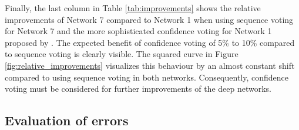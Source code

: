 \documentclass{jlcl}
\begin{document}
Finally, the last column in Table \ref{tab:improvements} shows the relative improvements of Network 7 compared to Network 1 when using sequence voting for Network 7 and the more sophisticated confidence voting for Network 1 proposed by \cite{reul2017voting}.
The expected benefit of confidence voting of 5\% to 10\% compared to sequence voting is clearly visible.
The squared curve in Figure \ref{fig:relative_improvements} visualizes this behaviour by an almost constant shift compared to using sequence voting in both networks.
Consequently, confidence voting must be considered for further improvements of the deep networks.

\subsection{Evaluation of errors}
\label{sec:evaluation_of_errors}
\end{document}
